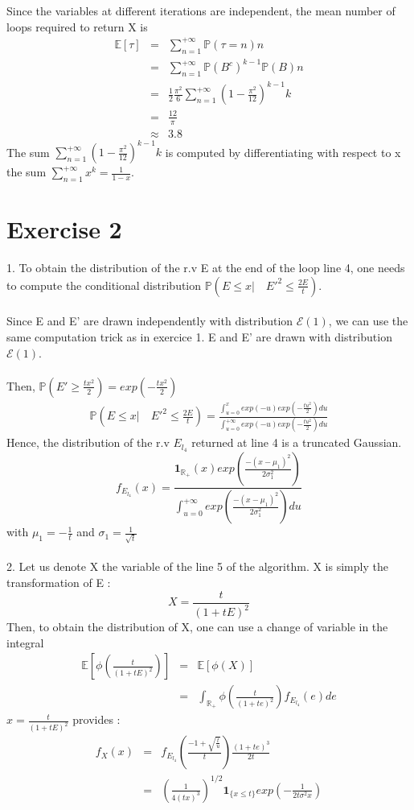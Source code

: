 Since the variables at different iterations are independent, the mean number of loops required to return X is 
\begin{eqnarray*}
	\mathbb{E}[\tau]&=&\sum_{n=1}^{+\infty}\mathbb{P}(\tau=n)n\\
	&=&\sum_{n=1}^{+\infty}\mathbb{P}(B^{c})^{k-1}\mathbb{P}(B)n\\
	&=&\frac{1}{2}\frac{\pi^{2}}{6}\sum_{n=1}^{+\infty}(1-\frac{\pi^{2}}{12})^{k-1}k\\
	&=&\frac{12}{\pi}\\
	&\approx& 3.8
\end{eqnarray*}
The sum $\sum_{n=1}^{+\infty}(1-\frac{\pi^{2}}{12})^{k-1}k$ is computed by differentiating with respect to x the sum $\sum_{n=1}^{+\infty}x^{k}=\frac{1}{1-x}$.



\section*{Exercise 2}
1. To obtain the distribution of the r.v E at the end of the loop line 4, one needs to compute the conditional distribution $ \mathbb{P}(E \leq x | \quad E'^{2} \leq \frac{2E}{t})$.~\\
~\\
Since E and E' are drawn independently with distribution $\mathcal{E}(1)$, we can use the same computation trick as in exercice 1. E and E' are drawn with distribution $\mathcal{E}(1)$.~\\
~\\
Then, $\mathbb{P}(E' \geq \frac{tx^{2}}{2})=exp(-\frac{tx^{2}}{2})$
\begin{eqnarray*}
	\mathbb{P}(E \leq x | \quad E'^{2} \leq \frac{2E}{t}) = \frac{\int_{u=0}^{x}exp(-u)exp(-\frac{tu^{2}}{2})du}{\int_{u=0}^{+\infty}exp(-u)exp(-\frac{tu^{2}}{2})du}
\end{eqnarray*}
Hence, the distribution of the r.v $E_{l_{4}}$ returned at line 4 is a truncated Gaussian.
$$f_{E_{l_{4}}}(x)=\frac{\textbf{1}_{\mathbb{R}_{+}}(x)exp(\frac{-(x-\mu_1)^{2}}{2\sigma_1^{2}})}{\int_{u=0}^{+\infty}exp(\frac{-(x-\mu_1)^{2}}{2\sigma_1^{2}})du}$$
with $\mu_1=-\frac{1}{t}$ and $\sigma_1=\frac{1}{\sqrt{t}}$~\\
~\\
2. Let us denote X the variable of the line 5 of the algorithm. X is simply the transformation of E :
$$X=\frac{t}{(1+tE)^{2}}$$
Then, to obtain the distribution of X, one can use a change of variable in the integral 
\begin{eqnarray*}
	\mathbb{E}[\phi(\frac{t}{(1+tE)^{2}})]&=&\mathbb{E}[\phi(X)]\\
	&=&\int_{\mathbb{R_+}}\phi(\frac{t}{(1+te)^{2}})f_{E_{l_{4}}}(e)de
\end{eqnarray*}
$x=\frac{t}{(1+tE)^{2}}$ provides :
\begin{eqnarray*}
	f_{X}(x)&=& f_{E_{l_{4}}}(\frac{-1+\sqrt{\frac{t}{u}}}{t})\frac{(1+te)^{3}}{2t}\\
	&=&(\frac{1}{4(tx)^{3}})^{1/2}\textbf{1}_{\{x \leq t\}} exp(-\frac{1}{2t\sigma^{2}x})
\end{eqnarray*}
